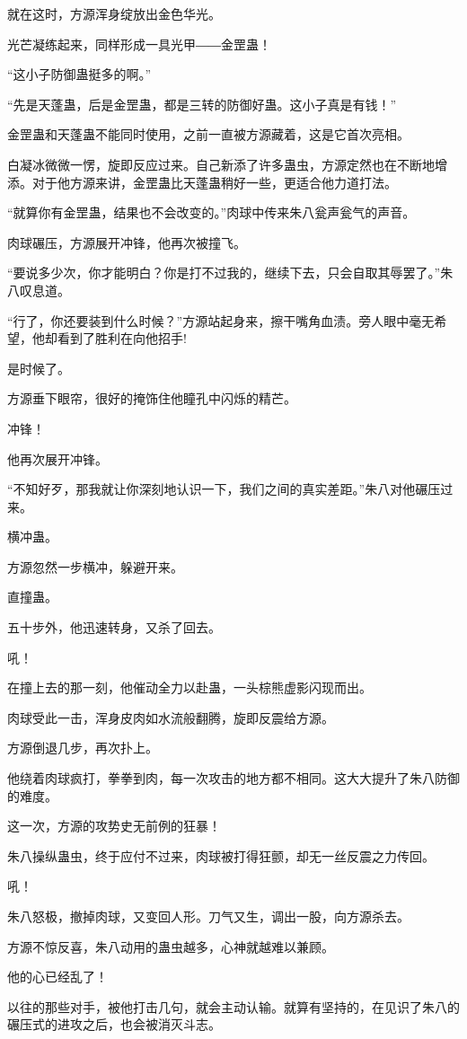 \begin{this_body}
就在这时，方源浑身绽放出金色华光。

光芒凝练起来，同样形成一具光甲――金罡蛊！

“这小子防御蛊挺多的啊。”

“先是天蓬蛊，后是金罡蛊，都是三转的防御好蛊。这小子真是有钱！”

金罡蛊和天蓬蛊不能同时使用，之前一直被方源藏着，这是它首次亮相。

白凝冰微微一愣，旋即反应过来。自己新添了许多蛊虫，方源定然也在不断地增添。对于他方源来讲，金罡蛊比天蓬蛊稍好一些，更适合他力道打法。

“就算你有金罡蛊，结果也不会改变的。”肉球中传来朱八瓮声瓮气的声音。

肉球碾压，方源展开冲锋，他再次被撞飞。

“要说多少次，你才能明白？你是打不过我的，继续下去，只会自取其辱罢了。”朱八叹息道。

“行了，你还要装到什么时候？”方源站起身来，擦干嘴角血渍。旁人眼中毫无希望，他却看到了胜利在向他招手!

是时候了。

方源垂下眼帘，很好的掩饰住他瞳孔中闪烁的精芒。

冲锋！

他再次展开冲锋。

“不知好歹，那我就让你深刻地认识一下，我们之间的真实差距。”朱八对他碾压过来。

横冲蛊。

方源忽然一步横冲，躲避开来。

直撞蛊。

五十步外，他迅速转身，又杀了回去。

吼！

在撞上去的那一刻，他催动全力以赴蛊，一头棕熊虚影闪现而出。

肉球受此一击，浑身皮肉如水流般翻腾，旋即反震给方源。

方源倒退几步，再次扑上。

他绕着肉球疯打，拳拳到肉，每一次攻击的地方都不相同。这大大提升了朱八防御的难度。

这一次，方源的攻势史无前例的狂暴！

朱八操纵蛊虫，终于应付不过来，肉球被打得狂颤，却无一丝反震之力传回。

吼！

朱八怒极，撤掉肉球，又变回人形。刀气又生，调出一股，向方源杀去。

方源不惊反喜，朱八动用的蛊虫越多，心神就越难以兼顾。

他的心已经乱了！

以往的那些对手，被他打击几句，就会主动认输。就算有坚持的，在见识了朱八的碾压式的进攻之后，也会被消灭斗志。


\end{this_body}
